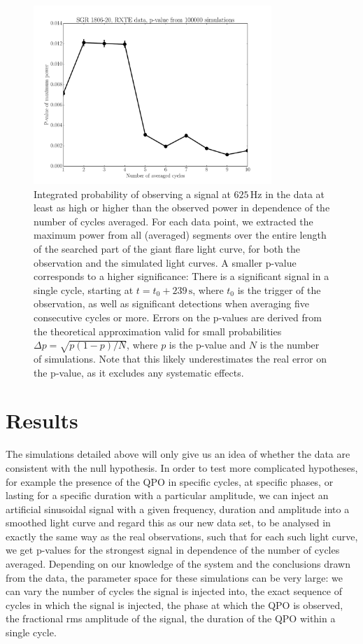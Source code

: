 \documentclass{emulateapj}
\begin{document}
\begin{figure}[htbp]
\begin{center}
\includegraphics[width=9cm]{f5.pdf}
\caption{Integrated probability of observing a signal at $625 \, \mathrm{Hz}$ in the \rxte data at least as high or higher than the observed power in dependence of the number of cycles averaged. For each data point, we extracted the maximum power from all (averaged) segments over the entire length of the searched part of the giant flare light curve, for both the observation and the simulated light curves. A smaller p-value corresponds to a higher significance: There is a significant signal in a single cycle, starting at $t = t_0 + 239 \, \mathrm{s}$, where $t_0$ is the trigger of the observation, as well as significant detections when averaging five consecutive cycles or more. Errors on the p-values are derived from the theoretical approximation valid for small probabilities $\Delta p = \sqrt{p (1-p)/N}$, where $p$ is the p-value and $N$ is the number of simulations. Note that this likely underestimates the real error on the p-value, as it excludes any systematic effects.}
\label{fig:rxte_pvals}
\end{center}
\end{figure}


\section{Results}
\label{sec:results}
The simulations detailed above will only give us an idea of whether the data are consistent with the null hypothesis. In order to test more complicated hypotheses, for example the presence of the QPO in specific cycles, at specific phases, or lasting for a specific duration with a particular amplitude, we can inject an artificial sinusoidal signal with a given frequency, duration and amplitude into a smoothed light curve and regard this as our new data set, to be analysed in exactly the same way as the real observations, such that for each such light curve, we get p-values for the strongest signal in dependence of the number of cycles averaged. Depending on our knowledge of the system and the conclusions drawn from the data, the parameter space for these simulations can be very large: we can vary the number of cycles the signal is injected into, the exact sequence of cycles in which the signal is injected, the phase at which the QPO is observed, the fractional rms amplitude of the signal, the duration of the QPO within a single cycle.
\end{document}
